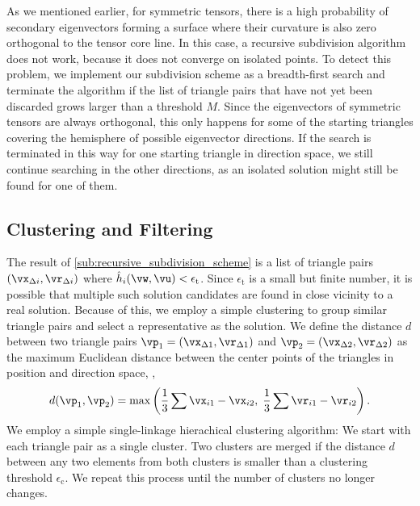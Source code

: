 %
As we mentioned earlier,  for symmetric
tensors, there is a high probability of secondary eigenvectors forming a
surface where their curvature is also zero orthogonal to the tensor core line.
%
In this case, a recursive subdivision algorithm does not work, because it does
not converge on isolated points.
%
To detect this problem, we implement our subdivision scheme as a breadth-first
search and terminate the algorithm if the list of triangle pairs that have
not yet been discarded grows larger than a threshold $M$.
%
Since the eigenvectors of symmetric tensors are always orthogonal, this only
happens for some of the starting triangles covering the hemisphere of possible
eigenvector directions.
%
If the search is terminated in this way for one starting triangle in direction
space, we still continue searching in the other directions, as an isolated
solution might still be found for one of them.
%
%

\subsection{Clustering and Filtering} %
\label{sub:clustering_and_filtering}
% 
The result of \cref{sub:recursive_subdivision_scheme} is a list of triangle
pairs $(\vx_{\Delta i}, \vr_{\Delta i})$ where $\hat{h}_i(\vw, \vu) <
\epsilon_{\mathrm{t}}$.
%
Since $\epsilon_{\mathrm{t}}$ is a small but finite number, it is possible that
multiple such solution candidates are found in close vicinity to a real solution.
%
Because of this, we employ a simple clustering to group similar triangle pairs
and select a representative as the solution.
%
We define the distance $d$ between two triangle pairs $\vp_1 = (\vx_{\Delta 1},
\vr_{\Delta 1})$ and $\vp_2 = (\vx_{\Delta 2}, \vr_{\Delta 2})$ as the
maximum Euclidean distance between the center points of the triangles in
position and direction space, \ie{},
%
\begin{equation}
  d(\vp_1, \vp_2)
    = \max\left(\frac{1}{3}\sum \vx_{i1} - \vx_{i2},
      \; \frac{1}{3}\sum \vr_{i1} - \vr_{i2}\right) \text{.}
\end{equation}
%
We employ a simple single-linkage hierachical clustering algorithm:
%
We start with each triangle pair as a single cluster.
%
Two clusters are merged if the distance $d$ between any two elements from both
clusters is smaller than a clustering threshold $\epsilon_{\mathrm{c}}$.
%
We repeat this process until the number of clusters no longer changes.
%

